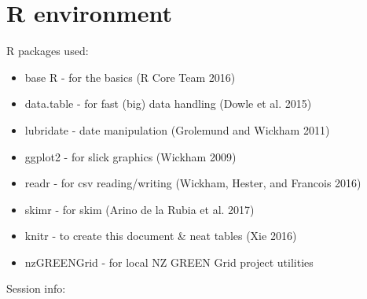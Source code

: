 \documentclass[]{article}
\providecommand{\tightlist}{%
  \setlength{\itemsep}{0pt}\setlength{\parskip}{0pt}}
\begin{document}
\section{R environment}\label{r-environment}

R packages used:

\begin{itemize}
\tightlist
\item
  base R - for the basics (R Core Team 2016)
\item
  data.table - for fast (big) data handling (Dowle et al. 2015)
\item
  lubridate - date manipulation (Grolemund and Wickham 2011)
\item
  ggplot2 - for slick graphics (Wickham 2009)
\item
  readr - for csv reading/writing (Wickham, Hester, and Francois 2016)
\item
  skimr - for skim (Arino de la Rubia et al. 2017)
\item
  knitr - to create this document \& neat tables (Xie 2016)
\item
  nzGREENGrid - for local NZ GREEN Grid project utilities
\end{itemize}

Session info:
\end{document}
